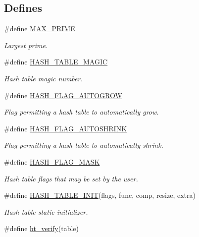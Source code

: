 \subsection*{Defines}
\begin{CompactItemize}
\item 
\#define \hyperlink{group__dbprim__hash_ga20}{MAX\_\-PRIME}
\begin{CompactList}\small\item\em Largest prime. \item\end{CompactList}\item 
\#define \hyperlink{group__dbprim__hash_ga21}{HASH\_\-TABLE\_\-MAGIC}
\begin{CompactList}\small\item\em Hash table magic number. \item\end{CompactList}\item 
\#define \hyperlink{group__dbprim__hash_ga22}{HASH\_\-FLAG\_\-AUTOGROW}
\begin{CompactList}\small\item\em Flag permitting a hash table to automatically grow. \item\end{CompactList}\item 
\#define \hyperlink{group__dbprim__hash_ga23}{HASH\_\-FLAG\_\-AUTOSHRINK}
\begin{CompactList}\small\item\em Flag permitting a hash table to automatically shrink. \item\end{CompactList}\item 
\#define \hyperlink{group__dbprim__hash_ga24}{HASH\_\-FLAG\_\-MASK}
\begin{CompactList}\small\item\em Hash table flags that may be set by the user. \item\end{CompactList}\item 
\#define \hyperlink{group__dbprim__hash_ga25}{HASH\_\-TABLE\_\-INIT}(flags, func, comp, resize, extra)
\begin{CompactList}\small\item\em Hash table static initializer. \item\end{CompactList}\item 
\#define \hyperlink{group__dbprim__hash_ga26}{ht\_\-verify}(table)

\end{CompactItemize}
